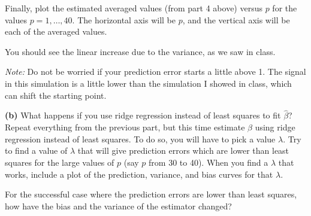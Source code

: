 \documentclass[11pt]{article}
\begin{document}
Finally, plot the estimated averaged values (from part 4 above) versus $p$ for
the values $p=1,\dots,40$.  The horizontal axis will be $p$, and the vertical
axis will be each of the averaged values.

You should see the linear increase due to the variance, as we saw in class.

\emph{Note:} Do not be worried if your prediction error starts a little above
1.  The signal in this simulation is a little lower than the simulation I
showed in class, which can shift the starting point.


\bigskip
\noindent

{\bf (b)} What happens if you use ridge regression instead of least squares to
fit $\hat{\beta}$?  Repeat everything from the previous part, but this time
estimate $\hat{\beta}$ using ridge regression instead of least squares.  To do
so, you will have to pick a value $\lambda$.  Try to find a value of $\lambda$
that will give prediction errors which are lower than least squares for the
large values of $p$ (say $p$ from 30 to 40).  When you find a $\lambda$ that
works, include a plot of the prediction, variance, and bias curves for that
$\lambda$. 

For the successful case where the prediction errors are lower than least
squares, how have the bias and the variance of the estimator changed?
\end{document}
